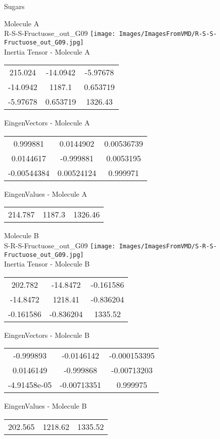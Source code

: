 \vtab[-2cm]
\begin{center}
{\large Sugars}
\end{center}
\begin{multicols}{2}
\begin{center}
Molecule A \\ 
R-S-S-Fructuose\_out\_G09
\texttt{[image: Images/ImagesFromVMD/R-S-S-Fructuose\_out\_G09.jpg]}
\\
Inertia Tensor - Molecule A \\
\vtab
\begin{tabular}{|c c c|}
215.024	 & 	-14.0942	 & 	-5.97678	 \\
-14.0942	 & 	1187.1	 & 	0.653719	 \\
-5.97678	 & 	0.653719	 & 	1326.43
\end{tabular}

\vtab
 EingenVectors - Molecule A     \\
\vtab
\begin{tabular}{|c c c|}
0.999881	 & 	0.0144902	 & 	0.00536739	 \\
0.0144617	 & 	-0.999881	 & 	0.0053195	 \\
-0.00544384	 & 	0.00524124	 & 	0.999971
\end{tabular}

\vtab
 EingenValues - Molecule A     \\
\vtab
\begin{tabular}{|c c c|}
214.787	 & 	1187.3	 & 	1326.46
\end{tabular}
\columnbreak

Molecule B \\ 
S-R-S-Fructuose\_out\_G09
\texttt{[image: Images/ImagesFromVMD/S-R-S-Fructuose\_out\_G09.jpg]}
\\
Inertia Tensor - Molecule B \\
\vtab
\begin{tabular}{|c c c|}
202.782	 & 	-14.8472	 & 	-0.161586	 \\
-14.8472	 & 	1218.41	 & 	-0.836204	 \\
-0.161586	 & 	-0.836204	 & 	1335.52
\end{tabular}

\vtab
 EingenVectors - Molecule B     \\
\vtab
\begin{tabular}{|c c c|}
-0.999893	 & 	-0.0146142	 & 	-0.000153395	 \\
0.0146149	 & 	-0.999868	 & 	-0.00713203	 \\
-4.91458e-05	 & 	-0.00713351	 & 	0.999975
\end{tabular}

\vtab
 EingenValues - Molecule B     \\
\vtab
\begin{tabular}{|c c c|}
202.565	 & 	1218.62	 & 	1335.52
\end{tabular}

\end{center}
\end{multicols}
